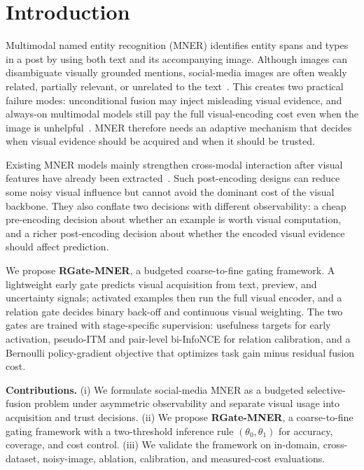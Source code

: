 \documentclass{llncs}
\begin{document}
\section{Introduction}
\label{sec:intro}
Multimodal named entity recognition (MNER) identifies entity spans and types in a post by using both text and its accompanying image. Although images can disambiguate visually grounded mentions, social-media images are often weakly related, partially relevant, or unrelated to the text~\cite{huang_mner-mi_2024,li_llms_2024}. This creates two practical failure modes: unconditional fusion may inject misleading visual evidence, and always-on multimodal models still pay the full visual-encoding cost even when the image is unhelpful~\cite{chen_can_2021,sun_rpbert_2021}. MNER therefore needs an adaptive mechanism that decides when visual evidence should be acquired and when it should be trusted.

Existing MNER models mainly strengthen cross-modal interaction after visual features have already been extracted~\cite{chen_can_2021,sun_rpbert_2021,xu_enhancing_2025,xu_effective_2024}. Such post-encoding designs can reduce some noisy visual influence but cannot avoid the dominant cost of the visual backbone. They also conflate two decisions with different observability: a cheap pre-encoding decision about whether an example is worth visual computation, and a richer post-encoding decision about whether the encoded visual evidence should affect prediction.

We propose \textbf{RGate-MNER}, a budgeted coarse-to-fine gating framework. A lightweight early gate predicts visual acquisition from text, preview, and uncertainty signals; activated examples then run the full visual encoder, and a relation gate decides binary back-off and continuous visual weighting. The two gates are trained with stage-specific supervision: usefulness targets for early activation, pseudo-ITM and pair-level bi-InfoNCE for relation calibration, and a Bernoulli policy-gradient objective that optimizes task gain minus residual fusion cost.

\noindent\textbf{Contributions.}
(i) We formulate social-media MNER as a budgeted selective-fusion problem under asymmetric observability and separate visual usage into acquisition and trust decisions.
(ii) We propose \textbf{RGate-MNER}, a coarse-to-fine gating framework with a two-threshold inference rule $(\theta_0,\theta_1)$ for accuracy, coverage, and cost control.
(iii) We validate the framework on in-domain, cross-dataset, noisy-image, ablation, calibration, and measured-cost evaluations.
\end{document}
